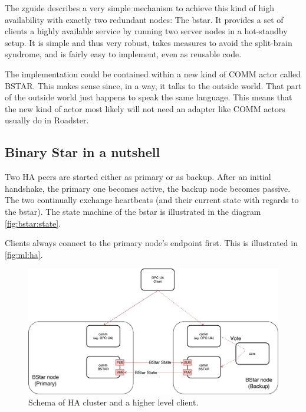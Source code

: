 The \gls{zguide} describes a very simple mechanism to achieve this kind of high
availability with exactly two redundant nodes: The \gls{bstar}. It
provides a set of clients a highly available service by running two server
nodes in a hot-standby setup. It is simple and thus very robust, takes measures to avoid the
split-brain syndrome, and is fairly easy to implement, even as reusable
code.

The implementation could be contained within a new kind of COMM actor
called BSTAR. This makes sense since, in a way, it talks to the outside world.
That part of the outside world just happens to speak the same language. This
means that the new kind of actor most likely will not need an adapter like COMM
actors usually do in Roadster.

\subsection{Binary Star in a nutshell}
Two HA peers are started either as primary or as backup. After an initial
handshake, the primary one becomes active, the backup node becomes passive. The
two continually exchange heartbeats (and their current state with regards to
the \gls{bstar}). The state machine of the \gls{bstar} is illustrated in the
diagram \autoref{fig:bstar:state}.

Clients always connect to the primary node's endpoint first. This
is illustrated in \autoref{fig:ml:ha}.

\begin{figure}[]
	\includegraphics[width=\textwidth]{img/ML-HA_bstar.pdf}
	\caption{Schema of HA cluster and a higher level client.}
	\label{fig:ml:ha}
\end{figure}

